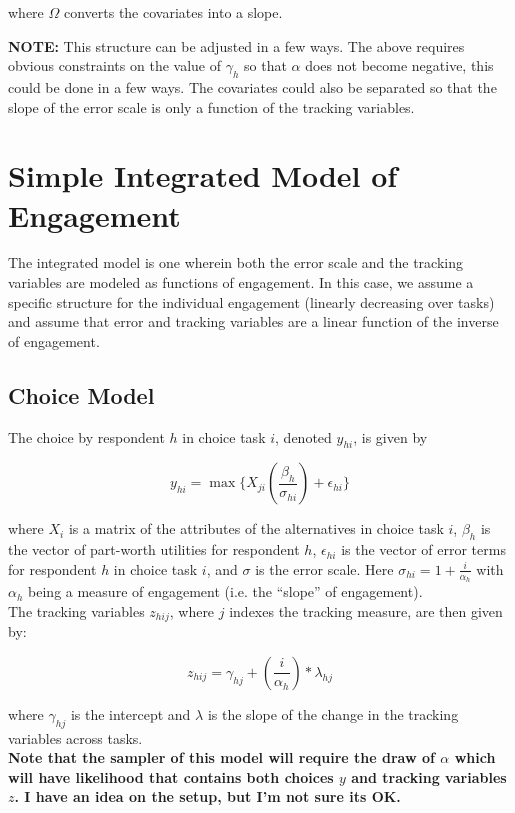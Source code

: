 \documentclass[12pt]{article}
\begin{document}
\noindent where $\Omega$ converts the covariates into a slope. \\\bigskip

\textbf{NOTE:} This structure can be adjusted in a few ways.  The above requires obvious constraints on the value of $\gamma_h$ so that $\alpha$ does not become negative, this could be done in a few ways.  The covariates could also be separated so that the slope of the error scale is only a function of the tracking variables.

\section{Simple Integrated Model of Engagement}

The integrated model is one wherein both the error scale and the tracking variables are modeled as functions of engagement. In this case, we assume a specific structure for the individual engagement (linearly decreasing over tasks) and assume that error and tracking variables are a linear function of the inverse of engagement. \\

\subsection{Choice Model}
\noindent The choice by respondent $h$ in choice task $i$, denoted $y_{hi}$, is given by

$$y_{hi}=\max\{X_{ji}\left(\frac{\beta_{h}}{\sigma_{hi}}\right) + \epsilon_{hi}\}$$

\noindent where $X_{i}$ is a matrix of the attributes of the alternatives in choice task $i$, $\beta_h$ is the vector of part-worth utilities for respondent $h$, $\epsilon_{hi}$ is the vector of error terms for respondent $h$ in choice task $i$, and $\sigma$ is the error scale.  Here $\sigma_{hi}=1+ \frac{i}{\alpha_{h}}$ with $\alpha_{h}$ being a measure of engagement (i.e. the ``slope'' of engagement).\\

\noindent The tracking variables $z_{hij}$, where $j$ indexes the tracking measure, are then given by:

$$z_{hij}=\gamma_{hj} + \left(\frac{i}{\alpha_{h}}\right)*\lambda_{hj}$$

\noindent where $\gamma_{hj}$ is the intercept and $\lambda$ is the slope of the change in the tracking variables across tasks.\\

\textbf{Note that the sampler of this model will require the draw of  $\alpha$ which will have likelihood that contains both choices $y$ and tracking variables $z$.  I have an idea on the setup, but I'm not sure its OK.}
\end{document}
